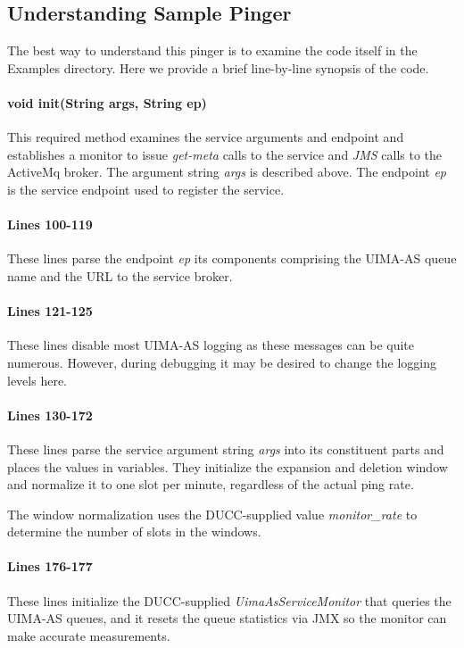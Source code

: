     
    \subsection{Understanding  Sample Pinger}

    The best way to understand this pinger is to examine the code itself in the
    Examples directory.  Here we provide a brief line-by-line synopsis of the code.

    \paragraph{void init(String args, String ep)}
    This required method examines the service arguments and endpoint and establishes a monitor
    to issue {\em get-meta} calls to the service and {\em JMS} calls to the 
    ActiveMq broker.  The argument string {\em args} is described above.  The
    endpoint {\em ep} is the service endpoint used to register the service.

    \paragraph{Lines 100-119}
    These lines parse the endpoint {\em ep} its components comprising the
    UIMA-AS queue name and the URL to the service broker.

    \paragraph{Lines 121-125}
    These lines disable most UIMA-AS logging as these messages can be quite
    numerous.  However, during debugging it may be desired to change the logging
    levels here.

    \paragraph{Lines 130-172}
    These lines parse the service argument string {\em args} into its constituent
    parts and places the values in variables.  They initialize the expansion
    and deletion window and normalize it to one slot per minute, regardless of
    the actual ping rate.

    The window normalization uses the DUCC-supplied value {\em monitor\_rate}
    to determine the number of slots in the windows.
   
    \paragraph{Lines 176-177}
    These lines initialize the DUCC-supplied {\em UimaAsServiceMonitor} that
    queries the UIMA-AS queues, and it resets the queue statistics via JMX so the
    monitor can make accurate measurements.


